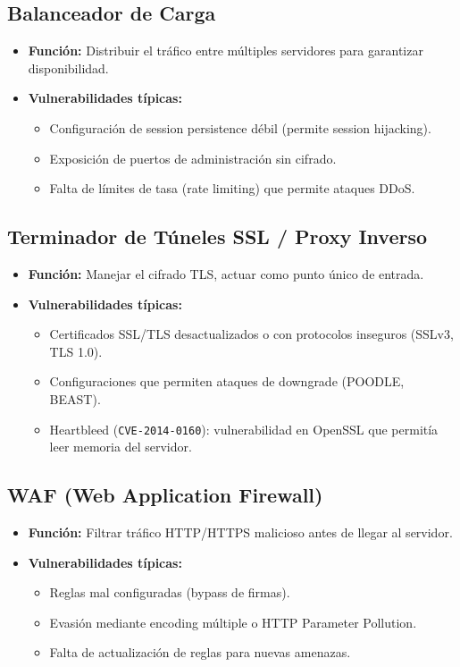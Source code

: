\documentclass[11pt,a4paper]{article}
\begin{document}
\subsection{Balanceador de Carga}
\begin{itemize}[leftmargin=*]
  \item \textbf{Función:} Distribuir el tráfico entre múltiples servidores para garantizar disponibilidad.
  \item \textbf{Vulnerabilidades típicas:}
  \begin{itemize}
    \item Configuración de session persistence débil (permite session hijacking).
    \item Exposición de puertos de administración sin cifrado.
    \item Falta de límites de tasa (rate limiting) que permite ataques DDoS.
  \end{itemize}
\end{itemize}

\subsection{Terminador de Túneles SSL / Proxy Inverso}
\begin{itemize}[leftmargin=*]
  \item \textbf{Función:} Manejar el cifrado TLS, actuar como punto único de entrada.
  \item \textbf{Vulnerabilidades típicas:}
  \begin{itemize}
    \item Certificados SSL/TLS desactualizados o con protocolos inseguros (SSLv3, TLS 1.0).
    \item Configuraciones que permiten ataques de downgrade (POODLE, BEAST).
    \item Heartbleed (\texttt{CVE-2014-0160}): vulnerabilidad en OpenSSL que permitía leer memoria del servidor.
  \end{itemize}
\end{itemize}

\subsection{WAF (Web Application Firewall)}
\begin{itemize}[leftmargin=*]
  \item \textbf{Función:} Filtrar tráfico HTTP/HTTPS malicioso antes de llegar al servidor.
  \item \textbf{Vulnerabilidades típicas:}
  \begin{itemize}
    \item Reglas mal configuradas (bypass de firmas).
    \item Evasión mediante encoding múltiple o HTTP Parameter Pollution.
    \item Falta de actualización de reglas para nuevas amenazas.
  \end{itemize}
\end{itemize}
\end{document}

